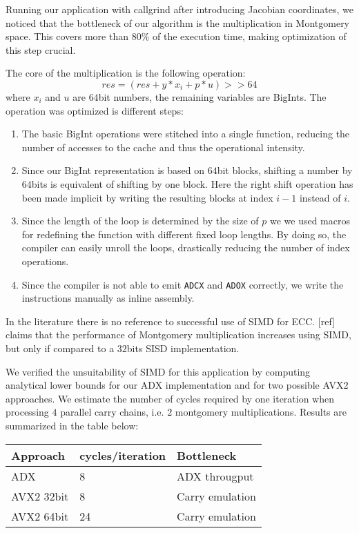 Running our application with callgrind after introducing Jacobian coordinates, we noticed that the bottleneck of our algorithm is the multiplication in Montgomery space. This covers more than $80\%$ of the execution time, making optimization of this step crucial.
 
The core of the multiplication is the following operation:
$$res = \left(res + y * x_i + p * u\right) >> 64$$
where $x_i$ and $u$ are $64$bit numbers, the remaining variables are BigInts. The operation was optimized is different steps:
\begin{enumerate}
\item The basic BigInt operations were stitched into a single function, reducing the number of accesses to the cache and thus the operational intensity.
\item Since our BigInt representation is based on $64$bit blocks, shifting a number by $64$bits is equivalent of shifting by one block. Here the right shift operation has been made implicit by writing the resulting blocks at index $i-1$ instead of $i$.
\item Since the length of the loop is determined by the size of $p$ we we used macros for redefining the function with different fixed loop lengths. By doing so, the compiler can easily unroll the loops, drastically reducing the number of index operations. 
\item Since the compiler is not able to emit \texttt{ADCX} and \texttt{ADOX} correctly, we write the instructions manually as inline assembly.
\end{enumerate}

In the literature there is no reference to successful use of SIMD for ECC. [ref] claims that the performance of Montgomery multiplication increases using SIMD, but only if compared to a $32$bits SISD implementation.

We verified the unsuitability of SIMD for this application by computing analytical lower bounds for our ADX implementation and for two possible AVX2 approaches.
We estimate the number of cycles required by one iteration when processing $4$ parallel carry chains, i.e. $2$ montgomery multiplications. Results are summarized in the table below:

\begin{tabular}{ |l|l|l|}
	\hline
 	Approach & cycles/iteration & Bottleneck \\ \hline
 	ADX & 8 & ADX througput \\ \hline
  	AVX2 32bit & 8 & Carry emulation \\ \hline
 	AVX2 64bit & 24 & Carry emulation \\ \hline
\end{tabular}

